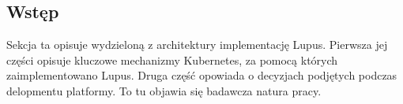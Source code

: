 \subsection{Wstęp}
Sekcja ta opisuje wydzieloną z architektury implementację Lupus. Pierwsza jej części opisuje kluczowe mechanizmy Kubernetes, za pomocą których zaimplementowano Lupus. Druga część opowiada o decyzjach podjętych podczas delopmentu platformy. To tu objawia się badawcza natura pracy. 